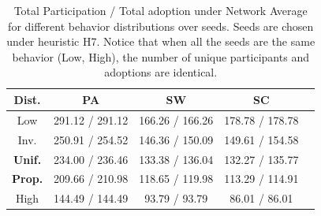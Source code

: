 \documentclass[letterpaper]{article}
\theoremstyle{plain} 		\newtheorem{thm}{Theorem}[section]
\theoremstyle{definition} 	\newtheorem{defn}[thm]{Definition}
\theoremstyle{remark}		\newtheorem{rem}{Remark}
\begin{document}
\begin{table}[htb]\footnotesize
\centering
  \caption{Total Participation / Total adoption under Network Average for different behavior distributions over seeds. Seeds are chosen under heuristic H7. Notice that when all the seeds are the same behavior (Low, High), the number of unique participants and adoptions are identical. }\label{tab:behav-part-network}
    \begin{tabular}{ccccc} \toprule
        Dist. & PA & SW & SC \\ \midrule
       Low & 291.12 / 291.12& 166.26 / 166.26 & 178.78 / 178.78 \\
       Inv.  & 250.91 / 254.52& 146.36 / 150.09& 149.61 / 154.58\\
       \textbf{Unif.} & 234.00 / 236.46& 133.38 / 136.04& 132.27 / 135.77\\
       \textbf{Prop.} & 209.66 / 210.98 & 118.65 / 119.98& 113.29 / 114.91\\
       High & 144.49 / 144.49  & 93.79 / 93.79 & 86.01 / 86.01\\ \bottomrule        
    \end{tabular}
 \end{table}{\tiny }

\end{document}
